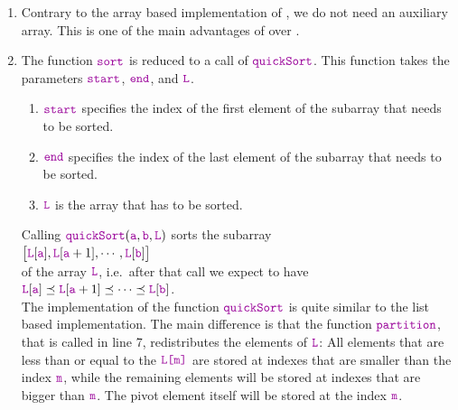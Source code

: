 \begin{enumerate}
\item Contrary to the array based implementation of , we do not need an auxiliary
      array.  This is one of the main advantages of  over .
\item The function $\mytt{sort}$ is reduced to a call of $\mytt{quickSort}$.  This function
      takes the parameters $\mytt{start}$, $\mytt{end}$, and $\mytt{L}$.  
      \begin{enumerate}
      \item $\mytt{start}$ specifies the index of the first element of the subarray that needs to be
            sorted.
      \item $\mytt{end}$ specifies the index of the last element of the subarray that needs to be
            sorted. 
      \item $\mytt{L}$ is the array that has to be sorted.
      \end{enumerate}
      Calling $\mytt{quickSort}(\mytt{a}, \mytt{b}, \mytt{L})$ sorts the subarray \\[0.2cm]
      \hspace*{1.3cm} 
      $\bigl[\mytt{L}[\mytt{a}], \mytt{L}[\mytt{a}+1], \cdots, \mytt{L}[\mytt{b}]\bigr]$
      \\[0.2cm]
      of the array $\mytt{L}$, i.e.~after that call we expect to have\\[0.2cm]
      \hspace*{1.3cm} 
      $\mytt{L}[\mytt{a}] \preceq \mytt{L}[\mytt{a}+1] \preceq \cdots \preceq \mytt{L}[\mytt{b}]$.
      \\[0.2cm]
      The implementation of the function $\mytt{quickSort}$
      is quite similar to the list based implementation.  The main difference is that the function
      $\mytt{partition}$, that is called in line 7, redistributes the elements of $\mytt{L}$:
      All elements that are less than or equal to the  $\mytt{L[m]}$
      are stored at indexes that are smaller than the index $\mytt{m}$, while the remaining elements will 
      be stored at indexes that are bigger than $\mytt{m}$.  The pivot element itself will be stored at the
      index $\mytt{m}$. 
\end{enumerate}

